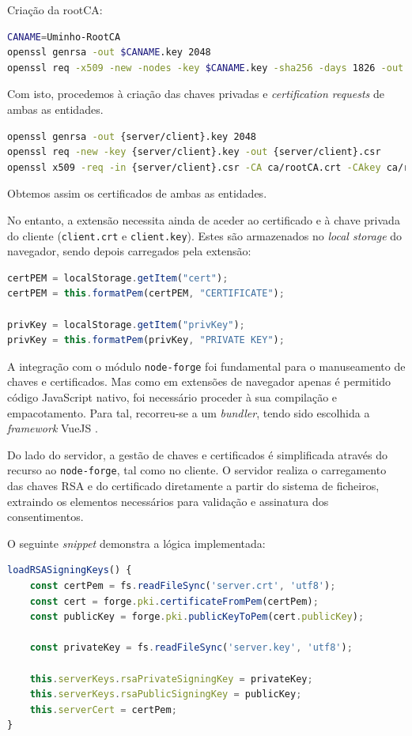 Criação da rootCA:

\begin{lstlisting}[language=sh]
CANAME=Uminho-RootCA
openssl genrsa -out $CANAME.key 2048
openssl req -x509 -new -nodes -key $CANAME.key -sha256 -days 1826 -out $CANAME.crt
\end{lstlisting}

Com isto, procedemos à criação das chaves privadas e \textit{certification requests} de ambas as entidades.

\begin{lstlisting}[language=sh]
openssl genrsa -out {server/client}.key 2048
openssl req -new -key {server/client}.key -out {server/client}.csr
openssl x509 -req -in {server/client}.csr -CA ca/rootCA.crt -CAkey ca/rootCA.key  -CAcreateserial -out {server/client}.crt -days 825 -sha256
\end{lstlisting}

Obtemos assim os certificados de ambas as entidades.

No entanto, a extensão necessita ainda de aceder ao certificado e à chave privada do cliente (\texttt{client.crt} e \texttt{client.key}). Estes são armazenados no \textit{local storage} do navegador, sendo depois carregados pela extensão:

\begin{lstlisting}[language=Javascript]
certPEM = localStorage.getItem("cert");
certPEM = this.formatPem(certPEM, "CERTIFICATE");

privKey = localStorage.getItem("privKey");
privKey = this.formatPem(privKey, "PRIVATE KEY");
\end{lstlisting}

A integração com o módulo \texttt{node-forge} foi fundamental para o manuseamento de chaves e certificados. Mas como em extensões de navegador apenas é permitido código JavaScript nativo, foi necessário proceder à sua compilação e empacotamento. Para tal, recorreu-se a um \textit{bundler}, tendo sido escolhida a \textit{framework} VueJS \citep{VueJS}.

Do lado do servidor, a gestão de chaves e certificados é simplificada através do recurso ao \texttt{node-forge}, tal como no cliente. O servidor realiza o carregamento das chaves RSA e do certificado diretamente a partir do sistema de ficheiros, extraindo os elementos necessários para validação e assinatura dos consentimentos.

O seguinte \textit{snippet} demonstra a lógica implementada:

\begin{lstlisting}[language=Javascript]
loadRSASigningKeys() {
	const certPem = fs.readFileSync('server.crt', 'utf8');
	const cert = forge.pki.certificateFromPem(certPem);
	const publicKey = forge.pki.publicKeyToPem(cert.publicKey);

	const privateKey = fs.readFileSync('server.key', 'utf8');

	this.serverKeys.rsaPrivateSigningKey = privateKey;
	this.serverKeys.rsaPublicSigningKey = publicKey;
	this.serverCert = certPem;
}
\end{lstlisting}

